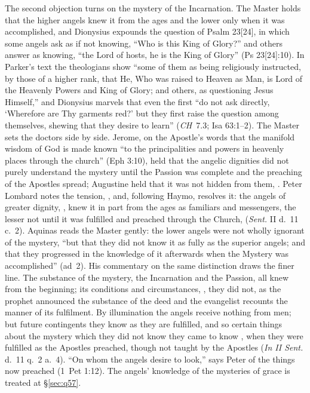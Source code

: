 The second objection turns on the mystery of the Incarnation. The Master
holds that the higher angels knew it from the ages and the lower only when
it was accomplished, and Dionysius expounds the question of Psalm 23[24], in
which some angels ask as if not knowing, ``Who is this King of Glory?'' and
others answer as knowing, ``the Lord of hosts, he is the King of Glory'' (Ps
23[24]:10). In Parker's text the theologians show ``some of them as being
religiously instructed, by those of a higher rank, that He, Who was raised
to Heaven as Man, is Lord of the Heavenly Powers and King of Glory; and
others, as questioning Jesus Himself,'' and Dionysius marvels that even the
first ``do not ask directly, `Wherefore are Thy garments red?' but they
first raise the question among themselves, shewing that they desire to
learn'' (\emph{CH}~7.3; Isa 63:1--2). The Master sets the doctors side by
side. Jerome, on the Apostle's words that the manifold wisdom of God is made
known ``to the principalities and powers in heavenly places through the
church'' (Eph 3:10), held that the angelic dignities did not purely
understand the mystery until the Passion was complete and the preaching of
the Apostles spread; Augustine held that it was not hidden from them,
. Peter
Lombard notes the tension, , and, following Haymo, resolves it:
the angels of greater dignity, , knew it in part from the ages as familiars and messengers, the
lesser not until it was fulfilled and preached through the Church,
 (\emph{Sent.}
II d.~11 c.~2). Aquinas reads the Master gently: the lower angels were not wholly
ignorant of the mystery, ``but that they did not know it as fully as the
superior angels; and that they progressed in the knowledge of it afterwards
when the Mystery was accomplished'' (ad~2). His commentary on the same
distinction draws the finer line. The substance of the mystery, the
Incarnation and the Passion, all knew from the beginning; its conditions
and circumstances, , they did
not, as the prophet announced the substance of the deed and the evangelist
recounts the manner of its fulfilment. By illumination the angels receive
nothing from men; but future contingents they know as they are fulfilled,
and so certain things about the mystery which they did not know they came to
know , when they were fulfilled as the Apostles preached, though
not taught by the Apostles (\emph{In II Sent.} d.~11 q.~2 a.~4). ``On whom the angels desire to look,'' says Peter of the
things now preached (1~Pet 1:12). The angels' knowledge of the mysteries
of grace is treated at \S\ref{sec:q57}.

